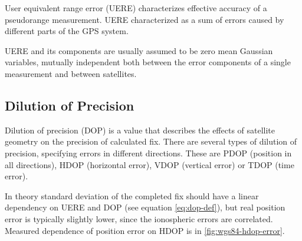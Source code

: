 
User equivalent range error (UERE) characterizes effective accuracy of a pseudorange measurement.
UERE characterized as a sum of errors caused by different parts of the GPS system.

UERE and its components are usually assumed to be zero mean Gaussian variables,
mutually independent both between the error components of a single measurement and between satellites.

\subsection{Dilution of Precision}
\label{sec:gps-dop}

Dilution of precision (DOP) is a value that describes the effects of satellite geometry
on the precision of calculated fix.
There are several types of dilution of precision, specifying errors in different directions.
These are PDOP (position in all directions), HDOP (horizontal error), VDOP (vertical error)
or TDOP (time error).

In theory standard deviation of the completed fix should have a linear dependency on
UERE and DOP (see equation \eqref{eq:dop-def}), but real position error is typically slightly lower,
since the ionospheric errors are correlated.
Measured dependence of position error on HDOP is in \cref{fig:wgs84-hdop-error}.

